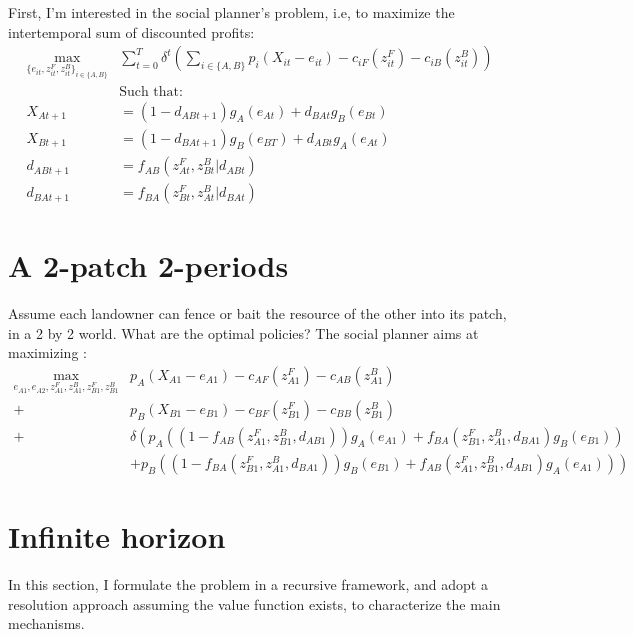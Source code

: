 \documentclass{article}
\begin{document}
First, I'm interested in the social planner's problem, i.e, to maximize the intertemporal sum of discounted profits:
\begin{align*}
    \max_{\{e_{it}, z_{it}^F, z_{it}^B \}_{i \in \{A,B\}}} & \sum_{t=0}^T \delta^t \left( \sum_{i \in \{A,B\}} p_i(X_{it} - e_{it}) - c_{iF}(z_{it}^F) - c_{iB}(z_{it}^B) \right)\\
     &\text{Such that:}\\
        X_{At+1} &= (1-d_{ABt+1})g_A(e_{At})+d_{BAt}g_B(e_{Bt})
    \\
    X_{Bt+1} &= (1 - d_{BAt+1})g_B(e_{BT}) + d_{ABt}g_A(e_{At})\\
     d_{ABt+1} &= f_{AB}(z^F_{At}, z^B_{Bt}| d_{ABt}) \\
    d_{BAt+1} &= f_{BA}(z^F_{Bt}, z^B_{At}| d_{BAt}) 
\end{align*}
\section{A 2-patch 2-periods}
Assume each landowner can fence or bait the resource of the other into its patch, in a 2 by 2 world. What are the optimal policies? The social planner aims at maximizing : 
\begin{align*}
\max_{e_{A1}, e_{A2}, z_{A1}^F, z_{A1}^B, z_{B1}^F, z_{B1}^B}&p_A(X_{A1}-e_{A1}) - c_{AF}(z_{A1}^F) - c_{AB}(z_{A1}^B) \\
+ &p_B(X_{B1}-e_{B1}) - c_{BF}(z_{B1}^F) - c_{BB}(z_{B1}^B) \\
+ & \delta \left(p_A((1-f_{AB}(z_{A1}^F, z_{B1}^B, d_{AB1}))g_A(e_{A1}) + f_{BA}(z_{B1}^F, z_{A1}^B, d_{BA1})g_B(e_{B1}))\right.\\
& + \left. p_B((1-f_{BA}(z_{B1}^F, z_{A1}^B, d_{BA1}))g_B(e_{B1}) + f_{AB}(z_{A1}^F, z_{B1}^B, d_{AB1})g_A(e_{A1})) \right)
\end{align*}

\section{Infinite horizon}
In this section, I formulate the problem in a recursive framework, and adopt a resolution approach assuming the value function exists, to characterize the main mechanisms. 
\end{document}

